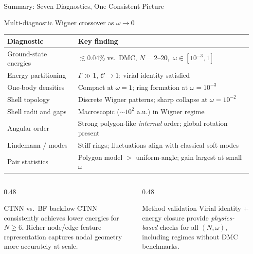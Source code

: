 \documentclass[aspectratio=169,10pt]{beamer}
\begin{document}
\begin{frame}{Summary: Seven Diagnostics, One Consistent Picture}
  \begin{block}{Multi-diagnostic Wigner crossover as $\omega\to0$}
    \footnotesize\renewcommand{\arraystretch}{1.1}
    \begin{tabular}{ll}
      \toprule
      \textbf{Diagnostic} & \textbf{Key finding} \\
      \midrule
      Ground-state energies & $\lesssim0.04\%$ vs.\ DMC,
                              $N=2$--$20$,\ $\omega\in[10^{-3},1]$ \\
      Energy partitioning   & $\Gamma\gg1$, $\mathcal{C}\to1$; virial identity satisfied \\
      One-body densities    & Compact at $\omega=1$; ring formation at $\omega=10^{-3}$ \\
      Shell topology        & Discrete Wigner patterns; sharp collapse at $\omega=10^{-2}$ \\
      Shell radii and gaps  & Macroscopic ($\sim10^2$ a.u.) in Wigner regime \\
      Angular order         & Strong polygon-like \emph{internal} order; global rotation present \\
      Lindemann / modes     & Stiff rings; fluctuations align with classical soft modes \\
      Pair statistics       & Polygon model $>$ uniform-angle; gain largest at small $\omega$ \\
      \bottomrule
    \end{tabular}
  \end{block}
  \smallskip
  \begin{columns}[T]
    \begin{column}{0.48\textwidth}
      \begin{exampleblock}{CTNN vs.\ BF backflow}
        \small CTNN consistently achieves lower energies for $N\ge6$.
        Richer node/edge feature representation captures
        nodal geometry more accurately at scale.
      \end{exampleblock}
    \end{column}
    \begin{column}{0.48\textwidth}
      \begin{exampleblock}{Method validation}
        \small Virial identity + energy closure provide
        \emph{physics-based} checks for all $(N,\omega)$,
        including regimes without DMC benchmarks.
      \end{exampleblock}
    \end{column}
  \end{columns}
\end{frame}
\end{document}
